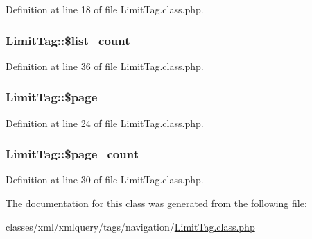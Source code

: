 Definition at line 18 of file Limit\+Tag.\+class.\+php.

\hypertarget{classLimitTag_aec51c8433d2e7a1e009b7c331702cef0}{
\subsubsection[{\$list\+\_\+count}]{\setlength{\rightskip}{0pt plus 5cm}Limit\+Tag\+::\$list\+\_\+count}}\label{classLimitTag_aec51c8433d2e7a1e009b7c331702cef0}


Definition at line 36 of file Limit\+Tag.\+class.\+php.

\hypertarget{classLimitTag_aae0faff40b6bcd38d72350bd851ecd4b}{
\subsubsection[{\$page}]{\setlength{\rightskip}{0pt plus 5cm}Limit\+Tag\+::\$page}}\label{classLimitTag_aae0faff40b6bcd38d72350bd851ecd4b}


Definition at line 24 of file Limit\+Tag.\+class.\+php.

\hypertarget{classLimitTag_a3d25270d024a280ac3e1cc7ada2c8fe0}{
\subsubsection[{\$page\+\_\+count}]{\setlength{\rightskip}{0pt plus 5cm}Limit\+Tag\+::\$page\+\_\+count}}\label{classLimitTag_a3d25270d024a280ac3e1cc7ada2c8fe0}


Definition at line 30 of file Limit\+Tag.\+class.\+php.



The documentation for this class was generated from the following file\+:\begin{DoxyCompactItemize}
\item 
classes/xml/xmlquery/tags/navigation/\hyperlink{LimitTag_8class_8php}{Limit\+Tag.\+class.\+php}\end{DoxyCompactItemize}
